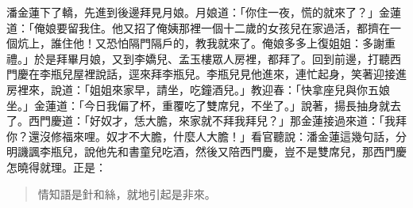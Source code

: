 潘金蓮下了轎，先進到後邊拜見月娘。月娘道：「你住一夜，慌的就來了？」金蓮道：「俺娘要留我住。他又招了俺姨那裡一個十二歲的女孩兒在家過活，都擠在一個炕上，誰住他！又恐怕隔門隔戶的，教我就來了。俺娘多多上復姐姐：多謝重禮。」於是拜畢月娘，又到李嬌兒、孟玉樓眾人房裡，都拜了。回到前邊，打聽西門慶在李瓶兒屋裡說話，逕來拜李瓶兒。李瓶兒見他進來，連忙起身，笑著迎接進房裡來，說道：「姐姐來家早，請坐，吃鐘酒兒。」教迎春：「快拿座兒與你五娘坐。」金蓮道：「今日我偏了杯，重覆吃了雙席兒，不坐了。」說著，揚長抽身就去了。西門慶道：「好奴才，恁大膽，來家就不拜我拜兒？」那金蓮接過來道：「我拜你？還沒修福來哩。奴才不大膽，什麼人大膽！」看官聽說：潘金蓮這幾句話，分明譏諷李瓶兒，說他先和書童兒吃酒，然後又陪西門慶，豈不是雙席兒，那西門慶怎曉得就理。正是：
\begin{quote}
情知語是針和絲，就地引起是非來。
\end{quote}
